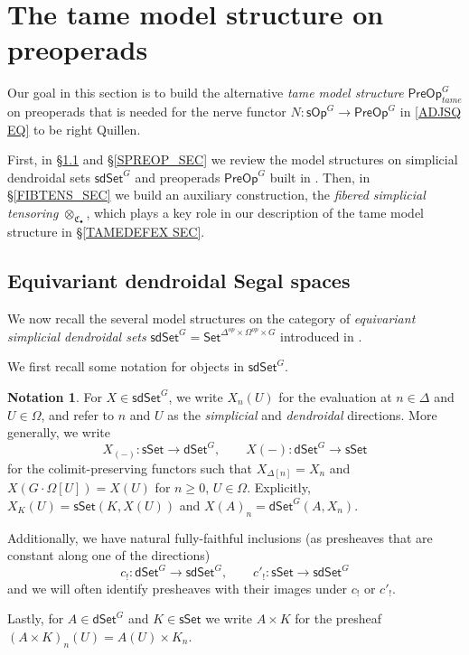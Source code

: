 \documentclass[a4paper,10pt
,draft
]{article}%
\numberwithin{equation}{section}
\numberwithin{figure}{section}
\theoremstyle{definition} %
\newtheorem{notation}[equation]{Notation}%
\newcommand{\longto}{\longrightarrow}%
\newcommand{\Set}{\ensuremath{\mathsf{Set}}}
\newcommand{\sSet}{\ensuremath{\mathsf{sSet}}}%
\newcommand{\dSet}{\mathsf{dSet}}
\newcommand{\1}{\ensuremath{\mathbbm 1}}%
\begin{document}
\section{The tame model structure on preoperads}
\label{TAME_SEC}


Our goal in this section is to build the alternative 
\emph{tame model structure}
$\mathsf{PreOp}^G_{tame}$
on preoperads that is needed for the nerve functor
$N \colon \mathsf{sOp}^G \to \mathsf{PreOp}^G$
in \eqref{ADJSQ EQ}
to be right Quillen. 

First, in \S \ref{JT_SEC} and \S \ref{SPREOP_SEC} 
we review the model structures on
simplicial dendroidal sets $\mathsf{sdSet}^G$
and preoperads $\mathsf{PreOp}^G$ built in \cite{BP_edss}.
Then, in \S \ref{FIBTENS_SEC}
we build an auxiliary construction, 
the \emph{fibered simplicial tensoring} $\otimes_{\mathfrak{C}_{\bullet}}$,
which plays a key role in our description of
the tame model structure in \S \ref{TAMEDEFEX SEC}. 





\subsection{Equivariant dendroidal Segal spaces}
\label{JT_SEC}


We now recall the several model structures on the category of
\textit{equivariant simplicial dendroidal sets}
$\mathsf{sdSet}^G = \Set^{\Delta^{op} \times \Omega^{op} \times G}$
introduced in \cite{BP_edss}.

We first recall some notation for objects in $\mathsf{sdSet}^G$.

\begin{notation}
      For $X \in \mathsf{sdSet}^G$, we write $X_n(U)$ for the evaluation at $n \in \Delta$ and $U \in \Omega$,
      and refer to $n$ and $U$ as the \textit{simplicial} and \textit{dendroidal} directions.
      More generally, we write
      \begin{equation}
            \label{SDSET_EQ}
            X_{(-)} \colon \sSet \to \dSet^G,
            \qquad
            X(-) \colon \dSet^G \to \sSet
      \end{equation}
      for the colimit-preserving functors
      such that $X_{\Delta[n]} = X_n$ and 
      $X\left(G \cdot\Omega[U]\right) = X(U)$ for $n \geq 0$, $U \in \Omega$.
      Explicitly, $X_K(U) = \sSet(K, X(U))$ and $X(A)_n = \dSet^G(A, X_n)$.
      
	Additionally, we have natural fully-faithful inclusions
	(as presheaves that are constant along one of the directions)
\[
	c_{!} \colon \dSet^G \longto \mathsf{sdSet}^G,
		\qquad
	c'_! \colon \sSet \longto \mathsf{sdSet}^G
\]
	and we will often identify presheaves with their images under $c_!$ or $c'_!$.

	Lastly, for $A \in \dSet^G$ and $K \in \sSet$ we write $A \times K$ for the presheaf $(A \times K)_n(U) = A(U) \times K_n$.
\end{notation}
\end{document}

